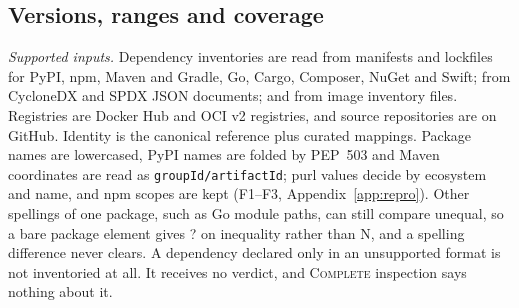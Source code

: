 \documentclass[11pt,a4paper]{article}
\newcommand{\code}[1]{\texttt{#1}}
\newcommand{\Non}{\textsf{N}}
\newcommand{\Ind}{\textsf{?}}
\begin{document}
\subsection{Versions, ranges and coverage}
\emph{Supported inputs.} Dependency inventories are read from
manifests and lockfiles for PyPI, npm, Maven and Gradle, Go, Cargo,
Composer, NuGet and Swift; from CycloneDX and SPDX JSON documents; and
from image inventory files. Registries are Docker Hub and OCI v2
registries, and source repositories are on GitHub. Identity is the
canonical reference plus curated mappings. Package names are
lowercased, PyPI names are folded by PEP~503 and Maven coordinates are
read as \code{groupId/artifactId}; purl values decide by ecosystem and
name, and npm scopes are kept (F1--F3, Appendix~\ref{app:repro}).
Other spellings of one package, such as Go module paths, can still
compare unequal, so a bare package element gives \Ind{} on inequality
rather than \Non{}, and a spelling difference never clears. A dependency declared only in an unsupported format is not
inventoried at all. It receives no verdict, and \textsc{Complete}
inspection says nothing about it.
\end{document}
